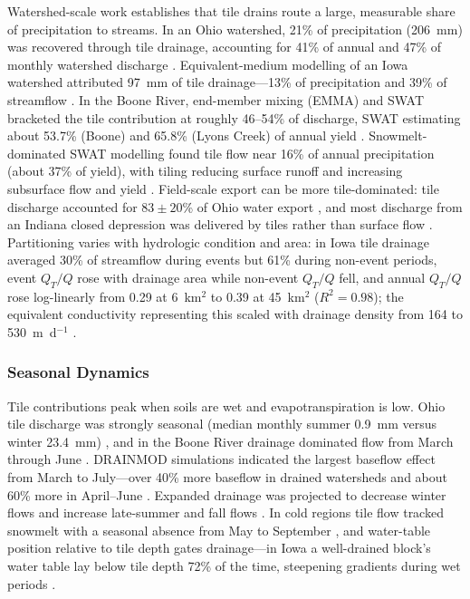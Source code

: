 \documentclass[11pt]{article}
\begin{document}
Watershed-scale work establishes that tile drains route a large, measurable share of precipitation to streams. In an Ohio watershed, 21\% of precipitation (206~mm) was recovered through tile drainage, accounting for 41\% of annual and 47\% of monthly watershed discharge \parencite{King2014}. Equivalent-medium modelling of an Iowa watershed attributed 97~mm of tile drainage---13\% of precipitation and 39\% of streamflow \parencite{Thomas2016}. In the Boone River, end-member mixing (EMMA) and SWAT bracketed the tile contribution at roughly 46--54\% of discharge, SWAT estimating about 53.7\% (Boone) and 65.8\% (Lyons Creek) of annual yield \parencite{Schilling2019}. Snowmelt-dominated SWAT modelling found tile flow near 16\% of annual precipitation (about 37\% of yield), with tiling reducing surface runoff and increasing subsurface flow and yield \parencite{Rahman2014}. Field-scale export can be more tile-dominated: tile discharge accounted for $83\pm20$\% of Ohio water export \parencite{Williams2018}, and most discharge from an Indiana closed depression was delivered by tiles rather than surface flow \parencite{Williams2019}. Partitioning varies with hydrologic condition and area: in Iowa tile drainage averaged 30\% of streamflow during events but 61\% during non-event periods, event $Q_T/Q$ rose with drainage area while non-event $Q_T/Q$ fell, and annual $Q_T/Q$ rose log-linearly from 0.29 at 6~km$^2$ to 0.39 at 45~km$^2$ ($R^2=0.98$); the equivalent conductivity representing this scaled with drainage density from 164 to 530~m~d$^{-1}$ \parencite{Thomas2016,King2014}.

\subsubsection{Seasonal Dynamics}

Tile contributions peak when soils are wet and evapotranspiration is low. Ohio tile discharge was strongly seasonal (median monthly summer 0.9~mm versus winter 23.4~mm) \parencite{King2014}, and in the Boone River drainage dominated flow from March through June \parencite{Schilling2019}. \textsc{DRAINMOD} simulations indicated the largest baseflow effect from March to July---over 40\% more baseflow in drained watersheds and about 60\% more in April--June \parencite{Schilling2008}. Expanded drainage was projected to decrease winter flows and increase late-summer and fall flows \parencite{Rahman2014}. In cold regions tile flow tracked snowmelt with a seasonal absence from May to September \parencite{Kompanizare2024}, and water-table position relative to tile depth gates drainage---in Iowa a well-drained block's water table lay below tile depth 72\% of the time, steepening gradients during wet periods \parencite{Logsdon2020}.
\end{document}
